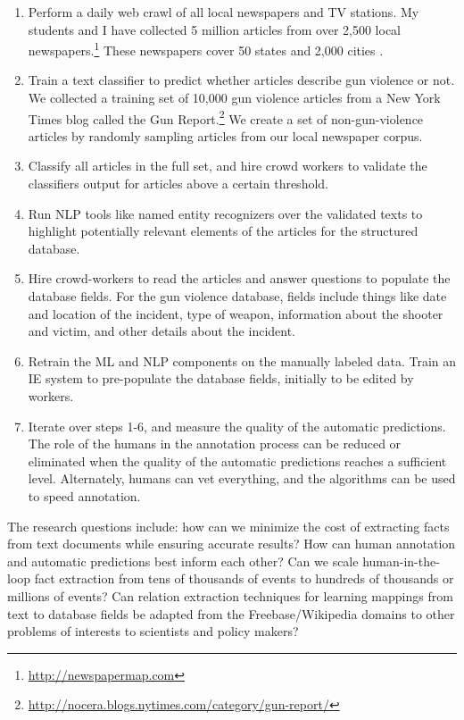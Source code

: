 \documentclass[11pt]{article}
\begin{document}
\begin{enumerate}
\item Perform a daily web crawl of all local newspapers and TV stations.  My students and I have collected 5 million articles from over 2,500 local newspapers.\footnote{\url{http://newspapermap.com}} These newspapers cover 50 states and 2,000 cities \cite{Irvine-EtAl-2014:LREC}.
\item Train a text classifier to predict whether articles describe gun violence or not.  We collected a training set of 10,000 gun violence articles  from a New York Times blog called the Gun Report.\footnote{\url{http://nocera.blogs.nytimes.com/category/gun-report/}} We create a set of non-gun-violence articles by randomly sampling articles from our local newspaper corpus.
\item Classify all articles in the full set, and hire crowd workers to validate the classifiers output for articles above a certain threshold.
\item Run NLP tools like named entity recognizers over the validated texts to highlight potentially relevant elements of the articles for the structured database.
\item Hire crowd-workers to read the articles and answer questions to populate the database fields.  For the gun violence database, fields include things like date and location of the incident, type of weapon, information about the shooter and victim, and other details about the incident. 
\item Retrain the ML and NLP components on the manually labeled data.  Train an IE system to pre-populate the database fields, initially to be edited by workers.
\item Iterate over steps 1-6, and measure the quality of the automatic predictions. The role of the humans in the annotation process can be reduced or eliminated when the quality of the automatic predictions reaches a sufficient level.  Alternately, humans can vet everything, and the algorithms can be used to speed annotation.
\end{enumerate}

The research questions include: how can we minimize the cost of extracting facts from text documents while ensuring accurate results?  How can human annotation and automatic predictions best inform each other?  Can we scale human-in-the-loop fact extraction from tens of thousands of events to hundreds of thousands or millions of events?   Can relation extraction techniques for learning mappings from text to database fields be adapted from the Freebase/Wikipedia domains to other problems of interests to scientists and policy makers? 
\end{document}

